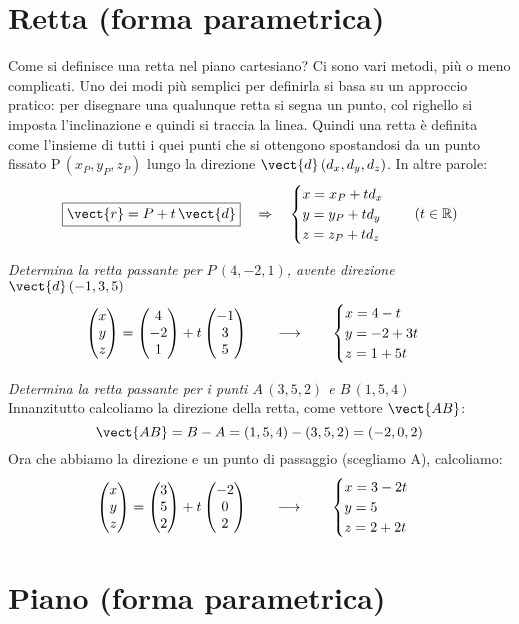 \section{Retta (forma parametrica)}

Come si definisce una retta nel piano cartesiano? Ci sono vari metodi, più o meno complicati. Uno dei modi più semplici per definirla si basa su un approccio pratico: per disegnare una qualunque retta si segna un punto, col righello si imposta l'inclinazione e quindi si traccia la linea. Quindi una retta è definita come l'insieme di tutti i quei punti che si ottengono spostandosi da un punto fissato P\,$(x_P,y_P,z_P)$ lungo la direzione $\vect{d}\,(d_x,d_y,d_z)$. In altre parole:
\[\boxed{\vect{r} = P+t \, \vect{d}} \quad \Rightarrow \quad \begin{cases}
x = x_P+t d_x \\
y = y_P+t d_y \\
z = z_P+t d_z
\end{cases}  \quad (t \in \mathbb{R})\]
\begin{esempio}
\emph{Determina la retta passante per $P\,(4,-2,1)$, avente direzione $\vect{d} \,(-1,3,5)$}
\[\begin{pmatrix} x\\ y\\ z \end{pmatrix} = \begin{pmatrix} 4\\ -2\\ 1 \end{pmatrix}+t \begin{pmatrix} -1\\ 3\\ 5 \end{pmatrix} \qquad \longrightarrow \qquad\begin{cases}
x = 4-t \\
y = -2+3t \\
z = 1+5t
\end{cases}\]
\end{esempio}
\begin{esempio}
 \emph{Determina la retta passante per i punti $A\,(3,5,2)$ e $B\,(1,5,4)$}\\[5pt]
 Innanzitutto calcoliamo la direzione della retta, come vettore $\vect{AB}$:
\[\vect{AB} = B-A = (1,5,4)-(3,5,2) = (-2,0,2)\]
Ora che abbiamo la direzione e un punto di passaggio (scegliamo A), calcoliamo:
\[\begin{pmatrix} x\\ y\\ z \end{pmatrix} = \begin{pmatrix} 3\\ 5\\ 2 \end{pmatrix}+t \begin{pmatrix} -2\\ 0\\ 2 \end{pmatrix} \qquad \longrightarrow \qquad\begin{cases}
x = 3-2t \\
y = 5 \\
z = 2+2t
\end{cases}\]
\end{esempio}

\section{Piano (forma parametrica)}

